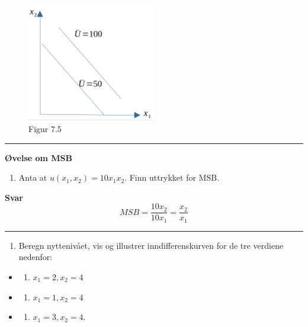 \documentclass[
  letterpaper,
  DIV=11,
  numbers=noendperiod]{scrartcl}
\providecommand{\tightlist}{%
  \setlength{\itemsep}{0pt}\setlength{\parskip}{0pt}}\usepackage{longtable,booktabs,array}
\begin{document}
\begin{figure}[H]

{\centering \includegraphics[width=0.5\textwidth,height=\textheight]{drawio/subsperf.png}

}

\caption{Figur 7.5}

\end{figure}%

\begin{center}\rule{0.5\linewidth}{0.5pt}\end{center}

\textbf{Øvelse om MSB}

\begin{enumerate}
\def\labelenumi{\arabic{enumi}.}
\tightlist
\item
  Anta at \(u(x_1,x_2) = 10x_1x_2\). Finn uttrykket for MSB.
\end{enumerate}

\textbf{Svar} \begin{equation*}
MSB = \frac{10x_2}{10x_1}= \frac{x_2}{x_1}
\end{equation*}

\begin{center}\rule{0.5\linewidth}{0.5pt}\end{center}

\begin{enumerate}
\def\labelenumi{\arabic{enumi}.}
\setcounter{enumi}{1}
\tightlist
\item
  Beregn nyttenivået, vis og illustrer inndifferenskurven for de tre
  verdiene nedenfor:
\end{enumerate}

\begin{itemize}
\tightlist
\item
  \begin{enumerate}
  \def\labelenumi{(\roman{enumi})}
  \tightlist
  \item
    \(x_1=2,x_2=4\)
  \end{enumerate}
\item
  \begin{enumerate}
  \def\labelenumi{(\roman{enumi})}
  \setcounter{enumi}{1}
  \tightlist
  \item
    \(x_1=1,x_2=4\)
  \end{enumerate}
\item
  \begin{enumerate}
  \def\labelenumi{(\roman{enumi})}
  \setcounter{enumi}{2}
  \tightlist
  \item
    \(x_1=3,x_2=4\).
  \end{enumerate}
\end{itemize}
\end{document}
